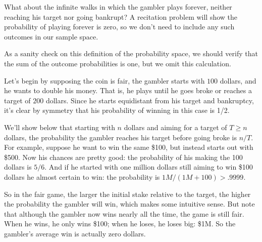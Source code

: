 \begin{staffnotes}
What about the infinite walks in which the gambler plays forever, neither
reaching his target nor going bankrupt?  A recitation problem will show the
probability of playing forever is zero, so we don't need to include any
such outcomes in our sample space.

As a sanity check on this definition of the probability space, we should
verify that the sum of the outcome probabilities is one, but we omit this
calculation.

\end{staffnotes}



Let's begin by supposing the coin is fair, the gambler starts with $100$
dollars, and he wants to double his money.  That is, he plays until he
goes broke or reaches a target of $200$ dollars.  Since he starts
equidistant from his target and bankruptcy, it's clear by symmetry that
his probability of winning in this case is 1/2.

We'll show below that starting with $n$ dollars and aiming for a target of
$T \geq n$ dollars, the probability the gambler reaches his target before
going broke is $n/T$.  For example, suppose he want to win the same \$100,
but instead starts out with \$500.  Now his chances are pretty good: the
probability of his making the 100 dollars is $5/6$.  And if he started
with one million dollars still aiming to win \$100 dollars he almost
certain to win: the probability is $1M/(1M + 100) > .9999$.

So in the fair game, the larger the initial stake relative to the target,
the higher the probability the gambler will win, which makes some
intuitive sense.  But note that although the gambler now wins nearly all
the time, the game is still fair.  When he wins, he only wins \$100; when
he loses, he loses big: \$1M.  So the gambler's average win is actually
zero dollars.

